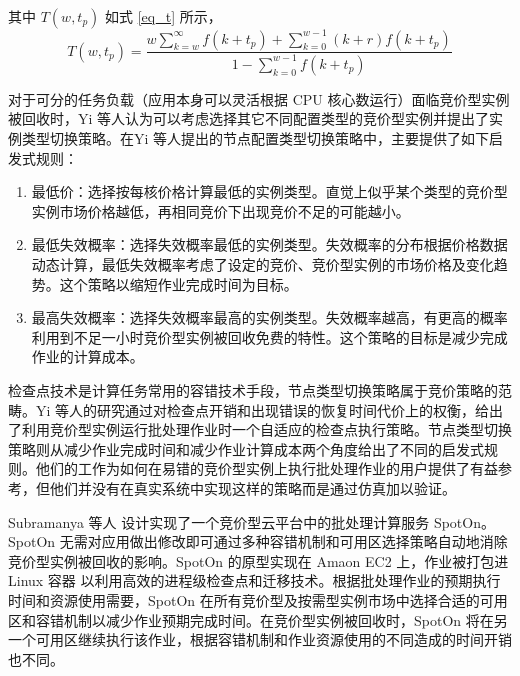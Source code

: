 其中 $T(w, t_p)$ 如式 \eqref{eq_t} 所示，
\begin{equation}\label{eq_t} 
T(w,t_p) = \frac{w\sum_{k=w}^{\infty}f(k+t_p)+\sum_{k=0}^{w-1}(k+r)f(k+t_p)}{1-\sum_{k=0}^{w-1}f(k+t_p)}
\end{equation}

对于可分的任务负载（应用本身可以灵活根据 CPU 核心数运行）面临竞价型实例被回收时，Yi 等人认为可以考虑选择其它不同配置类型的竞价型实例并提出了实例类型切换策略。在Yi 等人提出的节点配置类型切换策略中，主要提供了如下启发式规则：
\begin{enumerate}
\item 最低价：选择按每核价格计算最低的实例类型。直觉上似乎某个类型的竞价型实例市场价格越低，再相同竞价下出现竞价不足的可能越小。
\item 最低失效概率：选择失效概率最低的实例类型。失效概率的分布根据价格数据动态计算，最低失效概率考虑了设定的竞价、竞价型实例的市场价格及变化趋势。这个策略以缩短作业完成时间为目标。
\item 最高失效概率：选择失效概率最高的实例类型。失效概率越高，有更高的概率利用到不足一小时竞价型实例被回收免费的特性。这个策略的目标是减少完成作业的计算成本。
\end{enumerate}

检查点技术是计算任务常用的容错技术手段，节点类型切换策略属于竞价策略的范畴。Yi 等人的研究通过对检查点开销和出现错误的恢复时间代价上的权衡，给出了利用竞价型实例运行批处理作业时一个自适应的检查点执行策略。节点类型切换策略则从减少作业完成时间和减少作业计算成本两个角度给出了不同的启发式规则。他们的工作为如何在易错的竞价型实例上执行批处理作业的用户提供了有益参考，但他们并没有在真实系统中实现这样的策略而是通过仿真加以验证。

Subramanya 等人 \cite{Subramanya:2015:SBC:2806777.2806851} 设计实现了一个竞价型云平台中的批处理计算服务 SpotOn。SpotOn 无需对应用做出修改即可通过多种容错机制和可用区选择策略自动地消除竞价型实例被回收的影响。SpotOn 的原型实现在 Amaon EC2 上，作业被打包进 Linux 容器 \cite{LXC} 以利用高效的进程级检查点和迁移技术。根据批处理作业的预期执行时间和资源使用需要，SpotOn 在所有竞价型及按需型实例市场中选择合适的可用区和容错机制以减少作业预期完成时间。在竞价型实例被回收时，SpotOn 将在另一个可用区继续执行该作业，根据容错机制和作业资源使用的不同造成的时间开销也不同。

